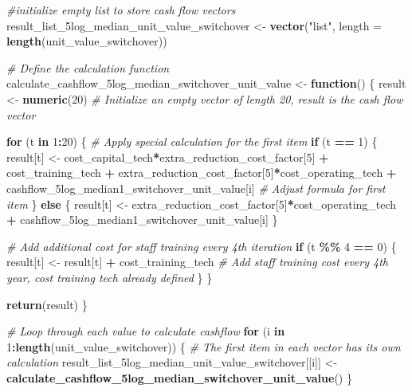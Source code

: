 \documentclass[
]{article}
\newenvironment{Shaded}{\begin{snugshade}}{\end{snugshade}}
\newcommand{\AttributeTok}[1]{\textcolor[rgb]{0.13,0.29,0.53}{#1}}
\newcommand{\CommentTok}[1]{\textcolor[rgb]{0.56,0.35,0.01}{\textit{#1}}}
\newcommand{\ControlFlowTok}[1]{\textcolor[rgb]{0.13,0.29,0.53}{\textbf{#1}}}
\newcommand{\DecValTok}[1]{\textcolor[rgb]{0.00,0.00,0.81}{#1}}
\newcommand{\FunctionTok}[1]{\textcolor[rgb]{0.13,0.29,0.53}{\textbf{#1}}}
\newcommand{\NormalTok}[1]{#1}
\newcommand{\OtherTok}[1]{\textcolor[rgb]{0.56,0.35,0.01}{#1}}
\newcommand{\SpecialCharTok}[1]{\textcolor[rgb]{0.81,0.36,0.00}{\textbf{#1}}}
\newcommand{\StringTok}[1]{\textcolor[rgb]{0.31,0.60,0.02}{#1}}
\begin{document}
\begin{Shaded}
\begin{Highlighting}[]
\CommentTok{\#initialize empty list to store cash flow vectors}
\NormalTok{result\_list\_5log\_median\_unit\_value\_switchover }\OtherTok{\textless{}{-}} \FunctionTok{vector}\NormalTok{(}\StringTok{"list"}\NormalTok{, }\AttributeTok{length =} \FunctionTok{length}\NormalTok{(unit\_value\_switchover))}


\CommentTok{\# Define the calculation function}
\NormalTok{calculate\_cashflow\_5log\_median\_switchover\_unit\_value }\OtherTok{\textless{}{-}} \ControlFlowTok{function}\NormalTok{() \{}
\NormalTok{  result }\OtherTok{\textless{}{-}} \FunctionTok{numeric}\NormalTok{(}\DecValTok{20}\NormalTok{)  }\CommentTok{\# Initialize an empty vector of length 20, result is the cash flow vector}
  
  \ControlFlowTok{for}\NormalTok{ (t }\ControlFlowTok{in} \DecValTok{1}\SpecialCharTok{:}\DecValTok{20}\NormalTok{) \{}
    \CommentTok{\# Apply special calculation for the first item}
    \ControlFlowTok{if}\NormalTok{ (t }\SpecialCharTok{==} \DecValTok{1}\NormalTok{) \{}
\NormalTok{      result[t] }\OtherTok{\textless{}{-}}\NormalTok{ cost\_capital\_tech}\SpecialCharTok{*}\NormalTok{extra\_reduction\_cost\_factor[}\DecValTok{5}\NormalTok{] }\SpecialCharTok{+}\NormalTok{ cost\_training\_tech }\SpecialCharTok{+}\NormalTok{ extra\_reduction\_cost\_factor[}\DecValTok{5}\NormalTok{]}\SpecialCharTok{*}\NormalTok{cost\_operating\_tech }\SpecialCharTok{+}\NormalTok{ cashflow\_5log\_median1\_switchover\_unit\_value[i] }\CommentTok{\# Adjust formula for first item}
\NormalTok{    \} }\ControlFlowTok{else}\NormalTok{ \{}
\NormalTok{      result[t] }\OtherTok{\textless{}{-}}\NormalTok{ extra\_reduction\_cost\_factor[}\DecValTok{5}\NormalTok{]}\SpecialCharTok{*}\NormalTok{cost\_operating\_tech }\SpecialCharTok{+}\NormalTok{ cashflow\_5log\_median1\_switchover\_unit\_value[i]}
\NormalTok{    \}}
    
    \CommentTok{\# Add additional cost for staff training every 4th iteration}
    \ControlFlowTok{if}\NormalTok{ (t }\SpecialCharTok{\%\%} \DecValTok{4} \SpecialCharTok{==} \DecValTok{0}\NormalTok{) \{}
\NormalTok{      result[t] }\OtherTok{\textless{}{-}}\NormalTok{ result[t] }\SpecialCharTok{+}\NormalTok{ cost\_training\_tech  }\CommentTok{\# Add staff training cost every 4th year, cost training tech already defined}
\NormalTok{    \}}
\NormalTok{  \}}
  
  \FunctionTok{return}\NormalTok{(result)}
\NormalTok{\}}

\CommentTok{\# Loop through each value to calculate cashflow}
\ControlFlowTok{for}\NormalTok{ (i }\ControlFlowTok{in} \DecValTok{1}\SpecialCharTok{:}\FunctionTok{length}\NormalTok{(unit\_value\_switchover)) \{}
  \CommentTok{\# The first item in each vector has its own calculation}
\NormalTok{  result\_list\_5log\_median\_unit\_value\_switchover[[i]] }\OtherTok{\textless{}{-}} \FunctionTok{calculate\_cashflow\_5log\_median\_switchover\_unit\_value}\NormalTok{()}
\NormalTok{\}}



\end{Highlighting}
\end{Shaded}
\end{document}
